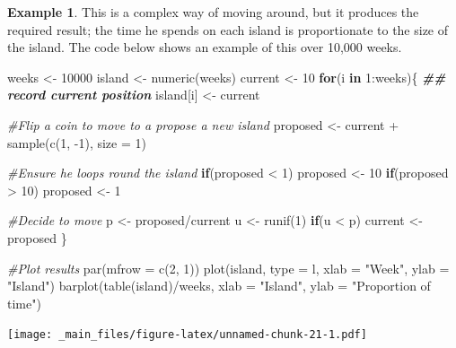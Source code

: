 \documentclass[
]{book}
\newenvironment{Shaded}{\begin{snugshade}}{\end{snugshade}}
\newcommand{\AttributeTok}[1]{\textcolor[rgb]{0.77,0.63,0.00}{#1}}
\newcommand{\CommentTok}[1]{\textcolor[rgb]{0.56,0.35,0.01}{\textit{#1}}}
\newcommand{\ControlFlowTok}[1]{\textcolor[rgb]{0.13,0.29,0.53}{\textbf{#1}}}
\newcommand{\DecValTok}[1]{\textcolor[rgb]{0.00,0.00,0.81}{#1}}
\newcommand{\DocumentationTok}[1]{\textcolor[rgb]{0.56,0.35,0.01}{\textbf{\textit{#1}}}}
\newcommand{\FunctionTok}[1]{\textcolor[rgb]{0.00,0.00,0.00}{#1}}
\newcommand{\NormalTok}[1]{#1}
\newcommand{\OtherTok}[1]{\textcolor[rgb]{0.56,0.35,0.01}{#1}}
\newcommand{\SpecialCharTok}[1]{\textcolor[rgb]{0.00,0.00,0.00}{#1}}
\newcommand{\StringTok}[1]{\textcolor[rgb]{0.31,0.60,0.02}{#1}}
\theoremstyle{definition}
\theoremstyle{definition}
\newtheorem{example}{Example}[chapter]
\theoremstyle{definition}
\theoremstyle{definition}
\theoremstyle{remark}
\begin{document}
\begin{example}
This is a complex way of moving around, but it produces the required result; the time he spends on each island is proportionate to the size of the island. The code below shows an example of this over 10,000 weeks.

\begin{Shaded}
\begin{Highlighting}[]
\NormalTok{weeks }\OtherTok{\textless{}{-}} \DecValTok{10000}
\NormalTok{island }\OtherTok{\textless{}{-}} \FunctionTok{numeric}\NormalTok{(weeks)}
\NormalTok{current }\OtherTok{\textless{}{-}} \DecValTok{10}
\ControlFlowTok{for}\NormalTok{(i }\ControlFlowTok{in} \DecValTok{1}\SpecialCharTok{:}\NormalTok{weeks)\{}
  \DocumentationTok{\#\# record current position}
\NormalTok{  island[i] }\OtherTok{\textless{}{-}}\NormalTok{ current}
  
  \CommentTok{\#Flip a coin to move to a propose a new island}
\NormalTok{  proposed }\OtherTok{\textless{}{-}}\NormalTok{ current }\SpecialCharTok{+} \FunctionTok{sample}\NormalTok{(}\FunctionTok{c}\NormalTok{(}\DecValTok{1}\NormalTok{, }\SpecialCharTok{{-}}\DecValTok{1}\NormalTok{), }\AttributeTok{size =} \DecValTok{1}\NormalTok{)}
  
  \CommentTok{\#Ensure he loops round the island}
  \ControlFlowTok{if}\NormalTok{(proposed }\SpecialCharTok{\textless{}} \DecValTok{1}\NormalTok{) }
\NormalTok{    proposed }\OtherTok{\textless{}{-}} \DecValTok{10}
  \ControlFlowTok{if}\NormalTok{(proposed }\SpecialCharTok{\textgreater{}} \DecValTok{10}\NormalTok{)}
\NormalTok{    proposed }\OtherTok{\textless{}{-}} \DecValTok{1}
  
  \CommentTok{\#Decide to move}
\NormalTok{  p }\OtherTok{\textless{}{-}}\NormalTok{ proposed}\SpecialCharTok{/}\NormalTok{current}
\NormalTok{  u }\OtherTok{\textless{}{-}} \FunctionTok{runif}\NormalTok{(}\DecValTok{1}\NormalTok{)}
  \ControlFlowTok{if}\NormalTok{(u }\SpecialCharTok{\textless{}}\NormalTok{ p)}
\NormalTok{    current }\OtherTok{\textless{}{-}}\NormalTok{ proposed}
\NormalTok{\}}

\CommentTok{\#Plot results}
\FunctionTok{par}\NormalTok{(}\AttributeTok{mfrow =} \FunctionTok{c}\NormalTok{(}\DecValTok{2}\NormalTok{, }\DecValTok{1}\NormalTok{))}
\FunctionTok{plot}\NormalTok{(island, }\AttributeTok{type =} \StringTok{\textquotesingle{}l\textquotesingle{}}\NormalTok{, }\AttributeTok{xlab =} \StringTok{"Week"}\NormalTok{, }\AttributeTok{ylab =} \StringTok{"Island"}\NormalTok{)}
\FunctionTok{barplot}\NormalTok{(}\FunctionTok{table}\NormalTok{(island)}\SpecialCharTok{/}\NormalTok{weeks, }\AttributeTok{xlab =} \StringTok{"Island"}\NormalTok{, }\AttributeTok{ylab =} \StringTok{"Proportion of time"}\NormalTok{)}
\end{Highlighting}
\end{Shaded}

\texttt{[image: \_main\_files/figure-latex/unnamed-chunk-21-1.pdf]}
\end{example}
\end{document}
